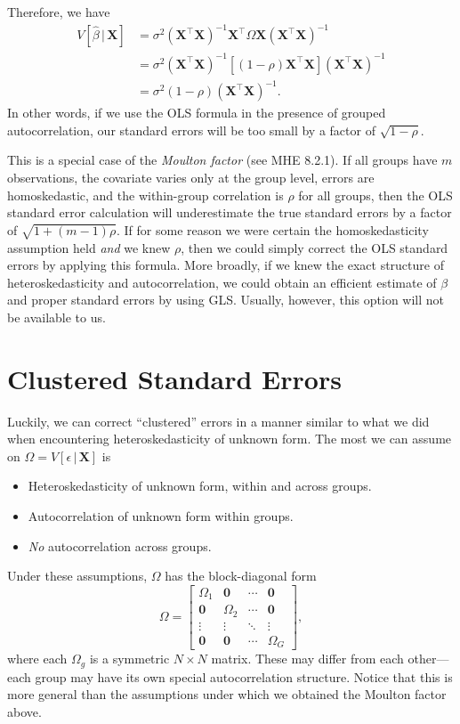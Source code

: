 \documentclass[
  12pt,
  oneside,openany]{book}
\begin{document}
Therefore, we have
\[
\begin{aligned}
V[\hat{\beta} \,|\, \mathbf{X}]
&= \sigma^2 (\mathbf{X}^\top \mathbf{X})^{-1} \mathbf{X}^\top \Omega \mathbf{X} (\mathbf{X}^\top \mathbf{X})^{-1} \\
&= \sigma^2 (\mathbf{X}^\top \mathbf{X})^{-1} [(1 - \rho) \mathbf{X}^\top \mathbf{X}] (\mathbf{X}^\top \mathbf{X})^{-1} \\
&= \sigma^2 (1 - \rho) (\mathbf{X}^\top \mathbf{X})^{-1}.
\end{aligned}
\]
In other words, if we use the OLS formula in the presence of grouped autocorrelation, our standard errors will be too small by a factor of \(\sqrt{1 - \rho}\).

This is a special case of the \emph{Moulton factor} (see MHE 8.2.1).
If all groups have \(m\) observations, the covariate varies only at the group level, errors are homoskedastic, and the within-group correlation is \(\rho\) for all groups, then the OLS standard error calculation will underestimate the true standard errors by a factor of \(\sqrt{1 + (m - 1) \rho}\).
If for some reason we were certain the homoskedasticity assumption held \emph{and} we knew \(\rho\), then we could simply correct the OLS standard errors by applying this formula.
More broadly, if we knew the exact structure of heteroskedasticity and autocorrelation, we could obtain an efficient estimate of \(\beta\) and proper standard errors by using GLS.
Usually, however, this option will not be available to us.

\hypertarget{clustered-standard-errors}{%
\section{Clustered Standard Errors}\label{clustered-standard-errors}}

Luckily, we can correct ``clustered'' errors in a manner similar to what we did when encountering heteroskedasticity of unknown form. The most we can assume on \(\Omega = V[\epsilon \,|\, \mathbf{X}]\) is

\begin{itemize}
\item
  Heteroskedasticity of unknown form, within and across groups.
\item
  Autocorrelation of unknown form within groups.
\item
  \emph{No} autocorrelation across groups.
\end{itemize}

Under these assumptions, \(\Omega\) has the block-diagonal form
\[
\Omega = \begin{bmatrix}
  \Omega_1 & \mathbf{0} & \cdots & \mathbf{0} \\
  \mathbf{0} & \Omega_2 & \cdots & \mathbf{0} \\
  \vdots & \vdots & \ddots & \vdots \\
  \mathbf{0} & \mathbf{0} & \cdots & \Omega_G
\end{bmatrix},
\]
where each \(\Omega_g\) is a symmetric \(N \times N\) matrix. These may differ from each other---each group may have its own special autocorrelation structure.
Notice that this is more general than the assumptions under which we obtained the Moulton factor above.
\end{document}
